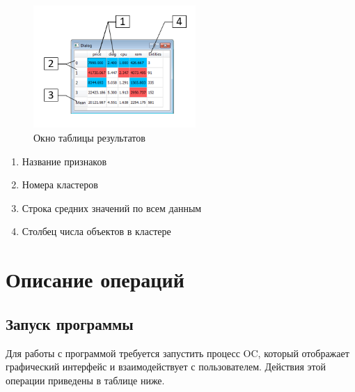 \documentclass[12pt,tikz]{instruction}
\begin{document}
\begin{figure}[h!]
	\centering
	\includegraphics[width=0.55\textwidth]{img/tableresultwindow}
	\caption{Окно таблицы результатов}
	\label{fig:tableresultwindow}
\end{figure}

\begin{enumerate}
	\item Название признаков
	\item Номера кластеров
	\item Строка средних значений по всем данным
	\item Столбец числа объектов в кластере
\end{enumerate}



\newpage
\section{Описание операций}


\subsection{Запуск программы}
Для работы с программой требуется запустить процесс OC, который отображает графический интерфейс и взаимодействует с пользователем. Действия этой операции приведены в таблице ниже.
\end{document}
